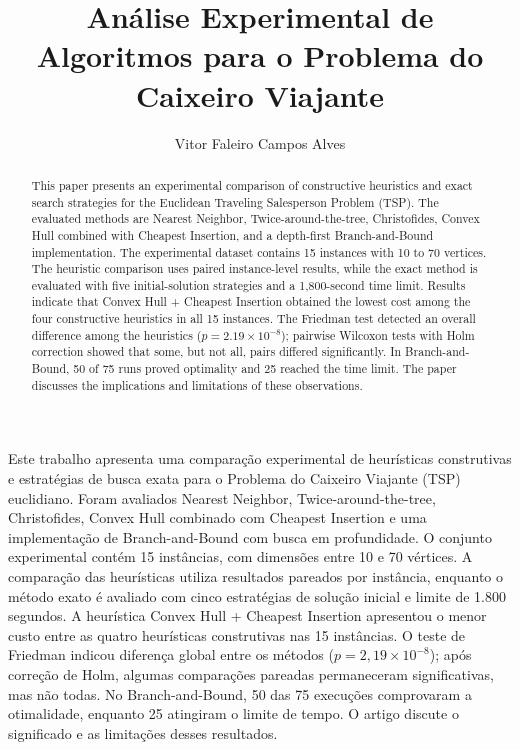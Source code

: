 \documentclass[12pt]{article}
\title{Análise Experimental de Algoritmos para o Problema do Caixeiro Viajante}
\author{Vitor Faleiro Campos Alves}
\begin{document}
\maketitle

\begin{abstract}
This paper presents an experimental comparison of constructive heuristics and exact search strategies for the Euclidean Traveling Salesperson Problem (TSP). The evaluated methods are Nearest Neighbor, Twice-around-the-tree, Christofides, Convex Hull combined with Cheapest Insertion, and a depth-first Branch-and-Bound implementation. The experimental dataset contains 15 instances with 10 to 70 vertices. The heuristic comparison uses paired instance-level results, while the exact method is evaluated with five initial-solution strategies and a 1,800-second time limit. Results indicate that Convex Hull + Cheapest Insertion obtained the lowest cost among the four constructive heuristics in all 15 instances. The Friedman test detected an overall difference among the heuristics ($p=2.19\times10^{-8}$); pairwise Wilcoxon tests with Holm correction showed that some, but not all, pairs differed significantly. In Branch-and-Bound, 50 of 75 runs proved optimality and 25 reached the time limit. The paper discusses the implications and limitations of these observations.
\end{abstract}

\begin{resumo}
Este trabalho apresenta uma comparação experimental de heurísticas construtivas e estratégias de busca exata para o Problema do Caixeiro Viajante (TSP) euclidiano. Foram avaliados Nearest Neighbor, Twice-around-the-tree, Christofides, Convex Hull combinado com Cheapest Insertion e uma implementação de Branch-and-Bound com busca em profundidade. O conjunto experimental contém 15 instâncias, com dimensões entre 10 e 70 vértices. A comparação das heurísticas utiliza resultados pareados por instância, enquanto o método exato é avaliado com cinco estratégias de solução inicial e limite de 1.800 segundos. A heurística Convex Hull + Cheapest Insertion apresentou o menor custo entre as quatro heurísticas construtivas nas 15 instâncias. O teste de Friedman indicou diferença global entre os métodos ($p=2{,}19\times10^{-8}$); após correção de Holm, algumas comparações pareadas permaneceram significativas, mas não todas. No Branch-and-Bound, 50 das 75 execuções comprovaram a otimalidade, enquanto 25 atingiram o limite de tempo. O artigo discute o significado e as limitações desses resultados.
\end{resumo}
\end{document}
